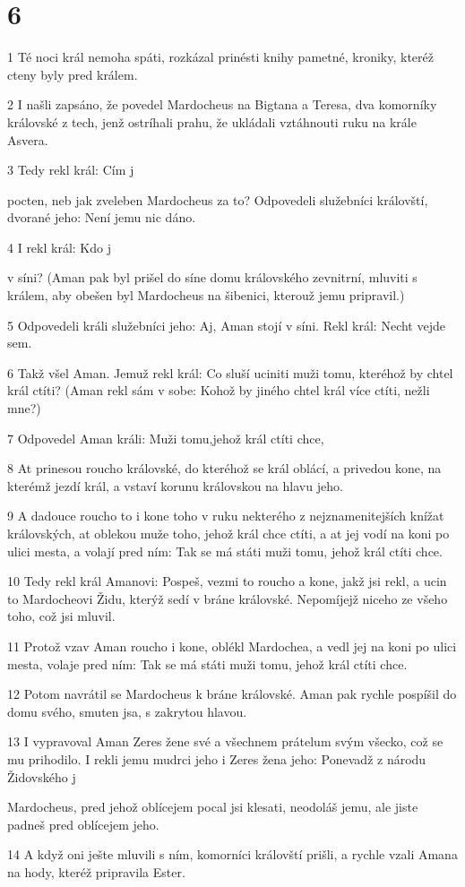 \chapter{6}

\par 1 Té noci král nemoha spáti, rozkázal prinésti knihy pametné, kroniky, kteréž cteny byly pred králem.
\par 2 I našli zapsáno, že povedel Mardocheus na Bigtana a Teresa, dva komorníky královské z tech, jenž ostríhali prahu, že ukládali vztáhnouti ruku na krále Asvera.
\par 3 Tedy rekl král: Cím j\par pocten, neb jak zveleben Mardocheus za to? Odpovedeli služebníci královští, dvorané jeho: Není jemu nic dáno.
\par 4 I rekl král: Kdo j\par v síni? (Aman pak byl prišel do síne domu královského zevnitrní, mluviti s králem, aby obešen byl Mardocheus na šibenici, kterouž jemu pripravil.)
\par 5 Odpovedeli králi služebníci jeho: Aj, Aman stojí v síni. Rekl král: Necht vejde sem.
\par 6 Takž všel Aman. Jemuž rekl král: Co sluší uciniti muži tomu, kteréhož by chtel král ctíti? (Aman rekl sám v sobe: Kohož by jiného chtel král více ctíti, nežli mne?)
\par 7 Odpovedel Aman králi: Muži tomu,jehož král ctíti chce,
\par 8 At prinesou roucho královské, do kteréhož se král oblácí, a privedou kone, na kterémž jezdí král, a vstaví korunu královskou na hlavu jeho.
\par 9 A dadouce roucho to i kone toho v ruku nekterého z nejznamenitejších knížat královských, at oblekou muže toho, jehož král chce ctíti, a at jej vodí na koni po ulici mesta, a volají pred ním: Tak se má státi muži tomu, jehož král ctíti chce.
\par 10 Tedy rekl král Amanovi: Pospeš, vezmi to roucho a kone, jakž jsi rekl, a ucin to Mardocheovi Židu, kterýž sedí v bráne královské. Nepomíjejž niceho ze všeho toho, což jsi mluvil.
\par 11 Protož vzav Aman roucho i kone, oblékl Mardochea, a vedl jej na koni po ulici mesta, volaje pred ním: Tak se má státi muži tomu, jehož král ctíti chce.
\par 12 Potom navrátil se Mardocheus k bráne královské. Aman pak rychle pospíšil do domu svého, smuten jsa, s zakrytou hlavou.
\par 13 I vypravoval Aman Zeres žene své a všechnem prátelum svým všecko, což se mu prihodilo. I rekli jemu mudrci jeho i Zeres žena jeho: Ponevadž z národu Židovského j\par Mardocheus, pred jehož oblícejem pocal jsi klesati, neodoláš jemu, ale jiste padneš pred oblícejem jeho.
\par 14 A když oni ješte mluvili s ním, komorníci královští prišli, a rychle vzali Amana na hody, kteréž pripravila Ester.


